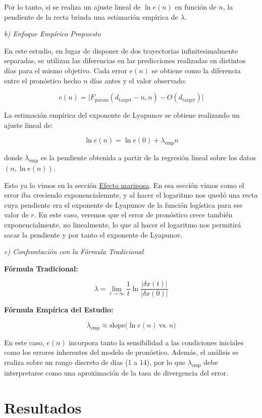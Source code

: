 \documentclass[
  11pt,
  a4paper,
  DIV=11,
  numbers=noendperiod]{scrreprt}
\begin{document}
Por lo tanto, si se realiza un ajuste lineal de \(\ln e(n)\) en función
de \(n\), la pendiente de la recta brinda una estimación empírica de
\(\lambda\).

\emph{b) Enfoque Empírico Propuesto}

En este estudio, en lugar de disponer de dos trayectorias
infinitesimalmente separadas, se utilizan las diferencias en las
predicciones realizadas en distintos días para el mismo objetivo. Cada
error \(e(n)\) se obtiene como la diferencia entre el pronóstico hecho
\(n\) días antes y el valor observado:

\[
e(n) = \bigl| F_{\text{param}}(d_{\text{target}}-n, n) - O(d_{\text{target}}) \bigr|
\]

La estimación empírica del exponente de Lyapunov se obtiene realizando
un ajuste lineal de:

\[
\ln e(n) = \ln e(0) + \lambda_{\text{emp}} n
\]

donde \(\lambda_{\text{emp}}\) es la pendiente obtenida a partir de la
regresión lineal sobre los datos \((n, \ln e(n))\).

Esto ya lo vimos en la sección \hyperref[sec-sensibilidad]{Efecto
mariposa}. En esa sección vimos como el error iba creciendo
exponencialemnte, y al hacer el logaritmo nos quedó una recta cuya
pendiente era el exponente de Lyapunov de la función logística para ese
valor de \(r\). En este caso, veremos que el error de pronóstico crece
también exponencialmente, no linealmente, lo que al hacer el logaritmo
nos permitirá sacar la pendiente y por tanto el exponente de Lyapunov.

\emph{c) Confrontación con la Fórmula Tradicional}

\textbf{Fórmula Tradicional:}

\[
\lambda = \lim_{t \to \infty} \frac{1}{t} \ln \frac{|\delta x(t)|}{|\delta x(0)|}
\]

\textbf{Fórmula Empírica del Estudio:}

\[
\lambda_{\text{emp}} \approx \text{slope}\bigl(\ln e(n)\ \text{vs.}\ n\bigr)
\]

En este caso, \(e(n)\) incorpora tanto la sensibilidad a las condiciones
iniciales como los errores inherentes del modelo de pronóstico. Además,
el análisis se realiza sobre un rango discreto de días (1 a 14), por lo
que \(\lambda_{\text{emp}}\) debe interpretarse como una aproximación de
la tasa de divergencia del error.

\section{Resultados}\label{resultados}
\end{document}
